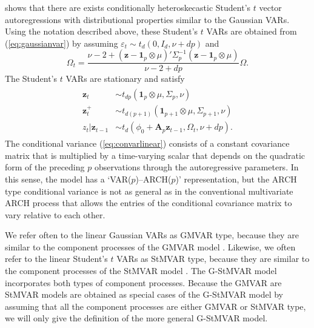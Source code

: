 \documentclass[nojss]{jss}
\begin{document}
\cite{Virolainen2:2021} shows that there are exists conditionally heteroskecastic Student's $t$ vector autoregressions with distributional properties similar to the Gaussian VARs. Using the notation described above, these Student's $t$ VARs are obtained from (\ref{eq:gaussianvar}) by assuming $\varepsilon_t\sim t_d(0,I_d,\nu + dp)$ and
\begin{equation}
\Omega_t = \frac{\nu - 2 + (\boldsymbol{z} - \boldsymbol{1}_p\otimes\mu)'\Sigma_p^{-1}(\boldsymbol{z} - \boldsymbol{1}_p\otimes\mu)}{\nu - 2 + dp}\Omega.\label{eq:convarlinear}
\end{equation}
The Student's $t$ VARs are stationary and satisfy \citep[Theorem 1]{Virolainen2:2021}
\begin{align}\label{eq:studentdist}
\begin{aligned}
\boldsymbol{z}_t & \sim t_{dp}(\boldsymbol{1}_p\otimes\mu,\Sigma_{p},\nu) \\
\boldsymbol{z}^{+}_t & \sim t_{d(p+1)}(\boldsymbol{1}_{p+1}\otimes\mu,\Sigma_{p+1},\nu) \\
z_t|\boldsymbol{z}_{t-1} & \sim t_d(\phi_{0} + \boldsymbol{A}_p\boldsymbol{z}_{t-1}, \Omega_t, \nu + dp).
 \end{aligned}
\end{align}
The conditional variance (\ref{eq:convarlinear}) consists of a constant covariance matrix that is multiplied by a time-varying scalar that depends on the quadratic form of the preceding $p$ observations through the autoregressive parameters.  In this sense,  the model has a ‘VAR($p$)–ARCH($p$)’ representation,  but the ARCH type conditional variance is not as general as in the conventional multivariate ARCH process \citep[e.g., ][Section 16.3]{Lutkepohl:2005} that allows the entries of the conditional covariance matrix to vary relative to each other.

We refer often to the linear Gaussian VARs as GMVAR type, because they are similar to the component processes of the GMVAR model \citep{Kalliovirta+Meitz+Saikkonen:2016}. Likewise, we often refer to the linear Student's $t$ VARs as StMVAR type, because they are similar to the component processes of the StMVAR model \citep{Virolainen2:2021}. The G-StMVAR model \citep{Virolainen2:2021} incorporates both types of component processes. Because the GMVAR are StMVAR models are obtained as special cases of the G-StMVAR model by assuming that all the component processes are either GMVAR or StMVAR type, we will only give the definition of the more general G-StMVAR model.
\end{document}
